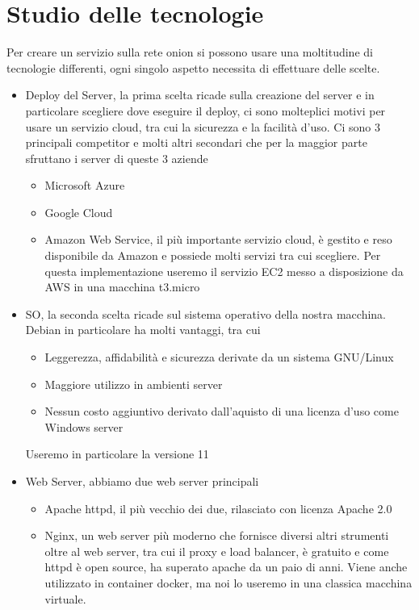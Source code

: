 \newpage
\section{Studio delle tecnologie}
Per creare un servizio sulla rete onion si possono usare una moltitudine di tecnologie differenti, ogni singolo aspetto necessita di effettuare delle scelte. \\
\begin{itemize}
    \item Deploy del Server, la prima scelta ricade sulla creazione del server e in particolare scegliere dove eseguire il deploy, ci sono molteplici motivi per usare un servizio cloud, tra cui la sicurezza e la facilità d'uso. Ci sono 3 principali competitor e molti altri secondari che per la maggior parte sfruttano i server di queste 3 aziende
    \begin{itemize}
        \item Microsoft Azure
        \item Google Cloud
        \item Amazon Web Service, il più importante servizio cloud, è gestito e reso disponibile da Amazon e possiede molti servizi tra cui scegliere. Per questa implementazione useremo il servizio EC2 messo a disposizione da AWS in una macchina t3.micro
    \end{itemize}
    \item SO, la seconda scelta ricade sul sistema operativo della nostra macchina. Debian in particolare ha molti vantaggi, tra cui 
    \begin{itemize}
        \item Leggerezza, affidabilità e sicurezza derivate da un sistema GNU/Linux
        \item Maggiore utilizzo in ambienti server
        \item Nessun costo aggiuntivo derivato dall'aquisto di una licenza d'uso come Windows server
    \end{itemize}
    Useremo in particolare la versione 11
    \item Web Server, abbiamo due web server principali 
    \begin{itemize}
        \item Apache httpd, il più vecchio dei due, rilasciato con licenza Apache 2.0
        \item Nginx, un web server più moderno che fornisce diversi altri strumenti oltre al web server, tra cui il proxy e load balancer, è gratuito e come httpd è open source, ha superato apache da un paio di anni. Viene anche utilizzato in container docker, ma noi lo useremo in una classica macchina virtuale.
    \end{itemize}
\end{itemize}

